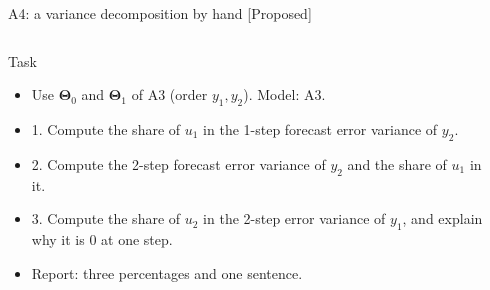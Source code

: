 \begin{frame}{A4: a variance decomposition by hand [Proposed]}
\propsub
\itemsize{\scriptsize}
\begin{columns}[T]
\begin{column}{\taskw}
\begin{block}{Task}
\begin{itemize}
    \item Use $\boldsymbol{\Theta}_0$ and $\boldsymbol{\Theta}_1$ of A3 (order $y_1, y_2$). Model: A3.
    \item 1. Compute the share of $u_1$ in the 1-step forecast error variance of $y_2$.
    \item 2. Compute the 2-step forecast error variance of $y_2$ and the share of $u_1$ in it.
    \item 3. Compute the share of $u_2$ in the 2-step error variance of $y_1$, and explain why it is 0 at one step.
    \item Report: three percentages and one sentence.
\end{itemize}
\end{block}
\end{column}
\begin{column}{\solw}
\end{column}
\end{columns}
\end{frame}

